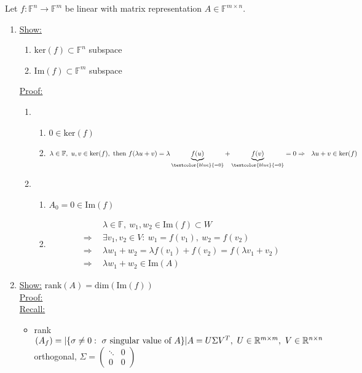 Let $f:\mathbb{F}^n\rightarrow\mathbb{F}^m$ be linear with matrix representation $A\in\mathbb{F}^{m\times n}$.
\begin{enumerate}
	\item 
	\underline{Show:}
	\begin{enumerate}
		\item $\text{ker}(f)\subset\mathbb{F}^n$ subspace
		\item $\text{Im}(f)\subset\mathbb{F}^m$ subspace
	\end{enumerate}
	\underline{Proof:}
	\begin{enumerate}
		\item \begin{enumerate}
			\item $0\in\text{ker}(f)$
			\item $\lambda\in\mathbb{F},~u,v\in\text{ker}(f),~\text{then}~f(\lambda u+v)=\lambda\underbrace{f(u)}_{\textcolor{blue}{=0}}+\underbrace{f(v)}_{\textcolor{blue}{=0}}=0\\
			\Rightarrow~~\lambda u+v\in\text{ker}(f)$
		\end{enumerate}
		\item \begin{enumerate}
			\item $A_0=0\in\text{Im}(f)$
			\item 
			\begin{align*}
			&\lambda\in\mathbb{F},~w_1,w_2\in\text{Im}(f)\subset W\\
			\Rightarrow~~&\exists v_1,v_2\in V:~w_1=f(v_1),~w_2=f(v_2)\\
			\Rightarrow~~&\lambda w_1+w_2=\lambda f(v_1)+f(v_2)=f(\lambda v_1+v_2)\\
			\Rightarrow~~&\lambda w_1+w_2\in\text{Im}(A)
			\end{align*}
		\end{enumerate}
	\end{enumerate}
%	
	\item 
	\underline{Show:} $\text{rank}(A) = \text{dim}(\text{Im}(f))$ \\
	\underline{Proof:}\\
	\underline{Recall:}\begin{itemize}
		\item rank$(A_f)=|\{\sigma\neq 0:~\sigma~\text{singular value of}~A\}|\\
		A=U\Sigma V^T,~U\in\mathbb{R}^{m\times m},~V\in\mathbb{R}^{n\times n}$ orthogonal, $\Sigma=\begin{pmatrix}\ddots&0\\0&0\end{pmatrix}$

\end{itemize}
\end{enumerate}
